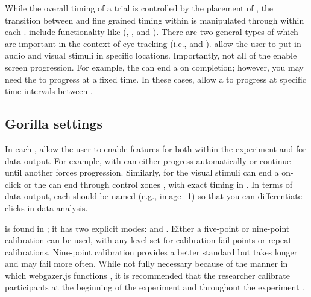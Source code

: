 While the overall timing of a trial is controlled by the placement of , the transition between  and fine grained timing within  is manipulated through  within each .  include functionality like (, , and ). There are two general types of  which are important in the context of eye-tracking (i.e.,  and ).   allow the user to put in audio and visual stimuli in specific locations. Importantly, not all of the   enable screen progression. For example, the   can end a  on completion; however, you may need the  to progress at a fixed time. In these cases,   allow a  to progress at specific time intervals between .  

\subsection{Gorilla settings}

In each ,  allow the user to enable features for both within the experiment and for data output. For example,  with  can either progress automatically or continue until another  forces progression. Similarly,  for the visual stimuli can end a  on-click or the  can end through control zones , with exact timing in . In terms of data output, each  should be named (e.g., image\_1) so that you can differentiate clicks in data analysis.

 is found in ; it has two explicit modes:  and . Either a five-point or nine-point calibration can be used, with any level set for calibration fail points or repeat calibrations. Nine-point calibration provides a better standard but takes longer and may fail more often. While not fully necessary because of the manner in which webgazer.js functions \parencite[e.g.,][]{ Chen_et_al_2001}, it is recommended that the researcher calibrate participants at the beginning of the experiment and throughout the experiment \parencite[][]{Prystauka_Altmann_Rothman_2023}. 

